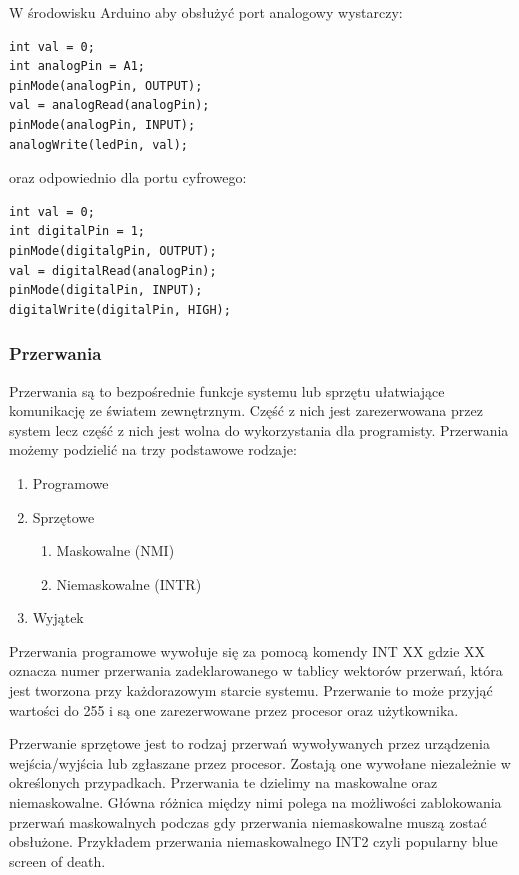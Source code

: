 \documentclass{xmgr}
\begin{document}
W środowisku Arduino aby obsłużyć port analogowy wystarczy:
\begin{lstlisting}[label=bot-dirs-alg,caption=Obsługa portu analogowego w środowisku Arduino]
int val = 0;
int analogPin = A1;	
pinMode(analogPin, OUTPUT);
val = analogRead(analogPin);
pinMode(analogPin, INPUT);
analogWrite(ledPin, val);
\end{lstlisting}

oraz odpowiednio dla portu cyfrowego:
\begin{lstlisting}[label=bot-dirs-alg,caption=Obsługa portu cyfrowego w środowisku Arduino]
int val = 0;
int digitalPin = 1;	
pinMode(digitalgPin, OUTPUT);
val = digitalRead(analogPin);
pinMode(digitalPin, INPUT);
digitalWrite(digitalPin, HIGH);
\end{lstlisting}

\subsubsection{Przerwania}

Przerwania są to bezpośrednie funkcje systemu lub sprzętu ułatwiające komunikację ze światem zewnętrznym. Część z nich jest zarezerwowana przez system lecz część z nich jest wolna do wykorzystania dla programisty. Przerwania możemy podzielić na trzy podstawowe rodzaje:

\begin{enumerate}
	\item Programowe
	\item Sprzętowe
	\begin{enumerate}
		\item Maskowalne (NMI)
		\item Niemaskowalne (INTR)
	\end{enumerate}
	\item Wyjątek
\end{enumerate}

Przerwania programowe wywołuje się za pomocą komendy INT XX gdzie XX oznacza numer przerwania zadeklarowanego w tablicy wektorów przerwań, która jest tworzona przy każdorazowym starcie systemu. Przerwanie to może przyjąć wartości do 255 i są one zarezerwowane przez procesor oraz użytkownika.

Przerwanie sprzętowe jest to rodzaj przerwań wywoływanych przez urządzenia wejścia/wyjścia lub zgłaszane przez procesor. Zostają one wywołane niezależnie w określonych przypadkach. Przerwania te dzielimy na maskowalne oraz niemaskowalne. Główna różnica między nimi polega na możliwości zablokowania przerwań maskowalnych podczas gdy przerwania niemaskowalne muszą zostać obsłużone. Przykładem przerwania niemaskowalnego INT2 czyli popularny blue screen of death.
\end{document}
